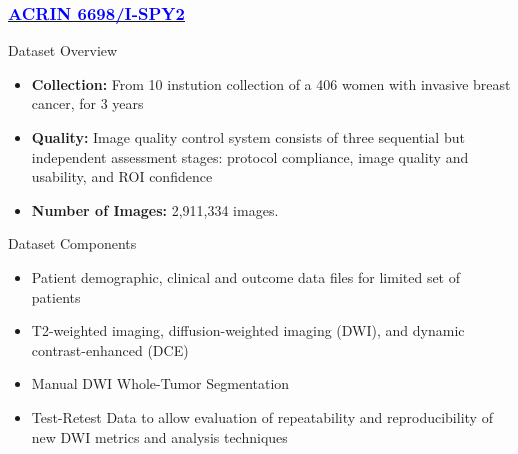 \documentclass{beamer}
\begin{document}
    \begin{frame}
        \frametitle{   \href{https://nbia.cancerimagingarchive.net/viewer/?study=1.3.6.1.4.1.14519.5.2.1.7695.4164.273481108061907436142425976120&series=1.3.6.1.4.1.14519.5.2.1.7695.4164.327894017749939121381164595822&token=c2744136-6276-4bb6-8111-2e85dcbda6cf}{\underline{\textcolor{blue}{ACRIN 6698/I-SPY2}}}}
        \begin{block}{Dataset Overview}
            \begin{itemize}
                \item \textbf{Collection:} From 10 instution collection of a 406 women with invasive breast cancer, for 3 years
                \item \textbf{Quality:} Image quality control system consists of three sequential but independent assessment stages: protocol compliance, image quality and usability, and ROI confidence
                \item \textbf{Number of Images:} 2,911,334 images.
            \end{itemize}
        \end{block}

        \begin{block}{Dataset Components}
            \begin{itemize}
                \item Patient demographic, clinical and outcome data files for limited set of patients
                \item T2-weighted imaging, diffusion-weighted imaging (DWI), and dynamic contrast-enhanced (DCE)
                \item Manual DWI Whole-Tumor Segmentation
                \item Test-Retest Data to allow evaluation of repeatability and reproducibility of new DWI metrics and analysis techniques
            \end{itemize}
        \end{block}
    \end{frame}
\end{document}
